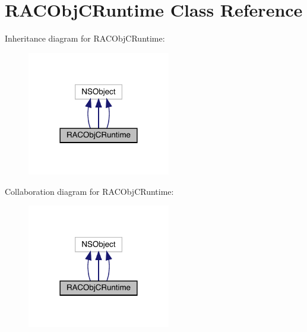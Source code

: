 \hypertarget{interface_r_a_c_obj_c_runtime}{}\section{R\+A\+C\+Obj\+C\+Runtime Class Reference}
\label{interface_r_a_c_obj_c_runtime}


Inheritance diagram for R\+A\+C\+Obj\+C\+Runtime\+:\nopagebreak
\begin{figure}[H]
\begin{center}
\leavevmode
\includegraphics[width=177pt]{interface_r_a_c_obj_c_runtime__inherit__graph}
\end{center}
\end{figure}


Collaboration diagram for R\+A\+C\+Obj\+C\+Runtime\+:\nopagebreak
\begin{figure}[H]
\begin{center}
\leavevmode
\includegraphics[width=177pt]{interface_r_a_c_obj_c_runtime__coll__graph}
\end{center}
\end{figure}
